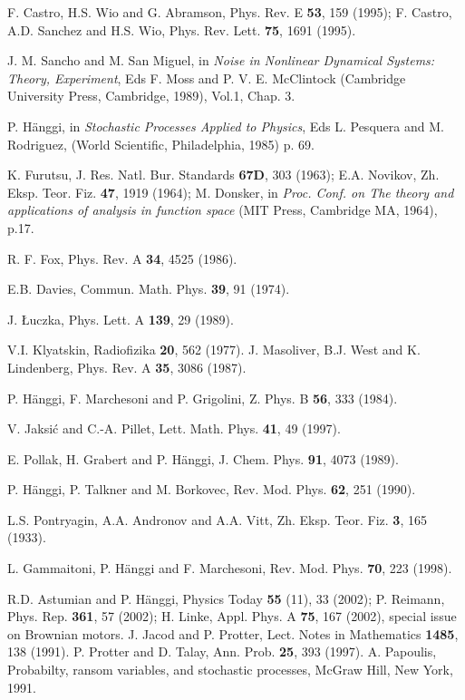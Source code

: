 \documentclass[authoryear,draft,1p,times]{elsarticle}
\renewcommand{\=}{\stackrel{\mathrm{d}}{=}}
\begin{document}
\begin{thebibliography}{99}
 F. Castro, H.S. Wio and G. Abramson, Phys. Rev. E {\bf 53}, 
159 (1995);  F. Castro, A.D. Sanchez and H.S. Wio, Phys. Rev. Lett. 
{\bf 75}, 1691 (1995).  
 
 J. M. Sancho and M. San Miguel, in  
{\it  Noise  in Nonlinear Dynamical Systems: Theory, Experiment},
Eds  F. Moss and P. V. E. McClintock 
    (Cambridge University Press, Cambridge, 1989), Vol.1, Chap. 3. 


 P. H\"anggi, in {\it Stochastic Processes Applied to Physics}, 
Eds  L. Pesquera and M. Rodriguez, (World Scientific, Philadelphia, 1985) 
p. 69. 
 
 K. Furutsu, J. Res. Natl. Bur. Standards {\bf 67D}, 303 (1963);
E.A. Novikov, Zh. Eksp. Teor. Fiz. {\bf 47}, 1919 (1964);
M. Donsker, in {\it Proc. Conf. on The theory and applications of 
analysis in function space} (MIT Press, Cambridge MA, 1964), p.17. 

 R. F. Fox, Phys. Rev. A {\bf 34}, 4525 (1986).

 E.B. Davies, Commun. Math. Phys. {\bf 39}, 91 (1974).  

 J. \L uczka, Phys. Lett. A {\bf 139}, 29 (1989). 

 V.I. Klyatskin, Radiofizika {\bf 20}, 562 (1977).
%
J. Masoliver, B.J. West and  K. Lindenberg, Phys. Rev. A {\bf 35},
 3086 (1987).

 P. H\"anggi, F. Marchesoni and P. Grigolini, Z. Phys. B {\bf 56}, 
333 (1984). 

 V. Jaksi{\'c} and C.-A. Pillet, Lett. Math. Phys. 
{\bf 41}, 49 (1997).

 E. Pollak, H. Grabert and P. H\"anggi, J. Chem. Phys. {\bf 91}, 
4073 (1989).

 P. H\"anggi, P. Talkner and M. Borkovec, Rev. Mod. Phys.
{\bf 62}, 251 (1990).

 L.S. Pontryagin, A.A. Andronov and A.A. Vitt, Zh. Eksp. Teor. Fiz. 
 {\bf 3}, 165 (1933). 


 L. Gammaitoni, P. H\"anggi and F. Marchesoni, 
 Rev. Mod. Phys. {\bf 70}, 223 (1998).
                                                                                
 R.D. Astumian and  P. H\"anggi, Physics Today  {\bf 55}
(11), 33 (2002); P. Reimann, Phys. Rep. {\bf 361}, 57 (2002); 
H. Linke, Appl. Phys. A
{\bf 75}, 167 (2002), special issue on Brownian motors.
%
  J. Jacod and P. Protter, Lect. Notes in Mathematics {\bf 1485}, 138 (1991). 
 P. Protter and D. Talay, Ann. Prob. {\bf 25}, 393 (1997). 
 A. Papoulis, Probabilty, ransom variables, and stochastic processes, 
McGraw Hill, New York, 1991. 


\end{thebibliography}
\end{document}
